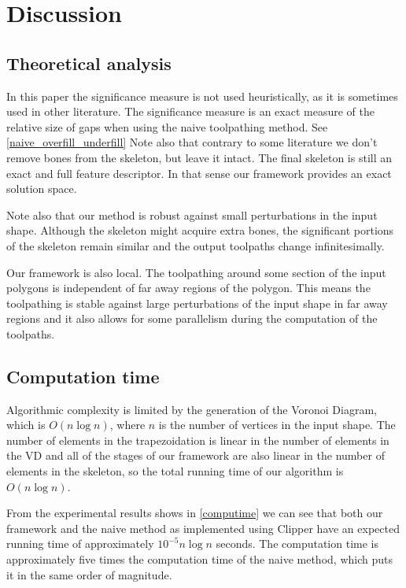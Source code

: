 \section{Discussion}

\subsection{Theoretical analysis}
In this paper the significance measure is not used heuristically, as it is sometimes used in other literature.
The significance measure is an exact measure of the relative size of gaps when using the naive toolpathing method.
See \cref{naive_overfill_underfill}
Note also that contrary to some literature we don't remove bones from the skeleton, but leave it intact.
The final skeleton is still an exact and full feature descriptor.
In that sense our framework provides an exact solution space.

Note also that our method is robust against small perturbations in the input shape.
Although the skeleton might acquire extra bones, the significant portions of the skeleton remain similar and the output toolpaths change infinitesimally.

Our framework is also local.
The toolpathing around some section of the input polygons is independent of far away regions of the polygon.
This means the toolpathing is stable against large perturbations of the input shape in far away regions
and it also allows for some parallelism during the computation of the toolpaths.


\subsection{Computation time}
Algorithmic complexity is limited by the generation of the Voronoi Diagram, which is $O(n \log n)$, where $n$ is the number of vertices in the input shape.
The number of elements in the trapezoidation is linear in the number of elements in the VD
and all of the stages of our framework are also linear in the number of elements in the skeleton,
so the total running time of our algorithm is $O(n \log n)$.

From the experimental results shows in \cref{computime} we can see that both our framework and the naive method as implemented using Clipper have an expected running time of approximately $10^{-5} n \log n$ seconds.
The computation time is approximately five times the computation time of the naive method, which puts it in the same order of magnitude.




